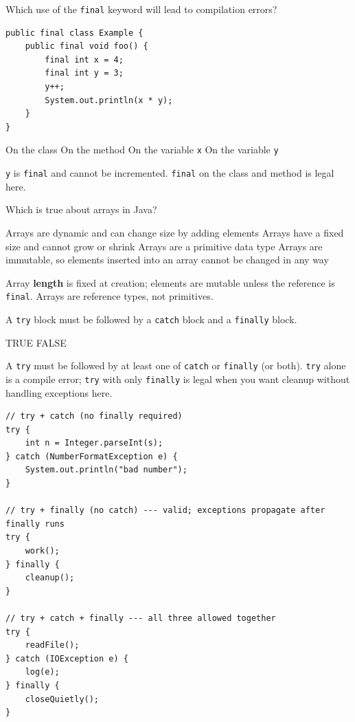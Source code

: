 \question[4]
Which use of the \texttt{final} keyword will lead to compilation errors?
\begin{lstlisting}[style=java]
public final class Example {
    public final void foo() {
        final int x = 4;
        final int y = 3;
        y++;
        System.out.println(x * y);
    }
}
\end{lstlisting}
\begin{choices}
  \choice On the class
  \choice On the method
  \choice On the variable \texttt{x}
  \CorrectChoice On the variable \texttt{y}
\end{choices}
\begin{solution}
  \texttt{y} is \texttt{final} and cannot be incremented. \texttt{final} on the class and method is legal here.
\end{solution}

\question[4]
Which is true about arrays in Java?
\begin{choices}
  \choice Arrays are dynamic and can change size by adding elements
  \CorrectChoice Arrays have a fixed size and cannot grow or shrink
  \choice Arrays are a primitive data type
  \choice Arrays are immutable, so elements inserted into an array cannot be changed in any way
\end{choices}
\begin{solution}
  Array \textbf{length} is fixed at creation; elements are mutable unless the reference is \texttt{final}. Arrays are reference types, not primitives.
\end{solution}

\question[4]
A \texttt{try} block must be followed by a \texttt{catch} block and a \texttt{finally} block.
\begin{choices}
  \choice TRUE
  \CorrectChoice FALSE
\end{choices}
\begin{solution}
  A \texttt{try} must be followed by at least one of \texttt{catch} or \texttt{finally} (or both). \texttt{try} alone is a compile error; \texttt{try} with only \texttt{finally} is legal when you want cleanup without handling exceptions here.
\begin{lstlisting}[style=java]
// try + catch (no finally required)
try {
    int n = Integer.parseInt(s);
} catch (NumberFormatException e) {
    System.out.println("bad number");
}

// try + finally (no catch) --- valid; exceptions propagate after finally runs
try {
    work();
} finally {
    cleanup();
}

// try + catch + finally --- all three allowed together
try {
    readFile();
} catch (IOException e) {
    log(e);
} finally {
    closeQuietly();
}
\end{lstlisting}
\end{solution}

